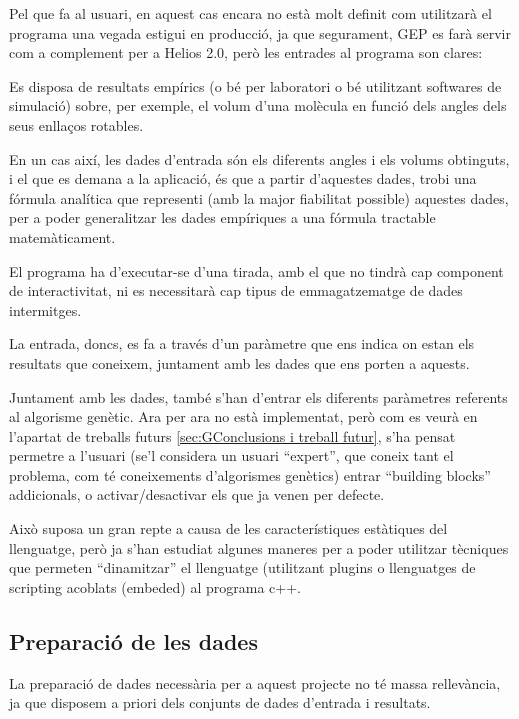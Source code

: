Pel que fa al usuari, en aquest cas encara no està molt definit com utilitzarà
el programa una vegada estigui en producció, ja que segurament, GEP es farà
servir com a complement per a Helios 2.0, però les entrades al programa son
clares:

Es disposa de resultats empírics (o bé per laboratori o bé utilitzant softwares
de simulació) sobre, per exemple, el volum d'una molècula en funció dels angles
dels seus enllaços rotables.

En un cas així, les dades d'entrada són els diferents angles i els volums
obtinguts, i el que es demana a la aplicació, és que a partir d'aquestes dades,
trobi una fórmula analítica que representi (amb la major fiabilitat possible)
aquestes dades, per a poder generalitzar les dades empíriques a una fórmula
tractable matemàticament.

El programa ha d'executar-se d'una tirada, amb el que no tindrà cap component de
interactivitat, ni es necessitarà cap tipus de emmagatzematge de dades
intermitges.

La entrada, doncs, es fa a través d'un paràmetre que ens indica on estan els
resultats que coneixem, juntament amb les dades que ens porten a aquests.

Juntament amb les dades, també s'han d'entrar els diferents paràmetres referents
al algorisme genètic.  Ara per ara no està implementat, però com es veurà en
l'apartat de treballs futurs \ref{sec:GConclusions i treball futur}, s'ha pensat
permetre a l'usuari (se'l considera un usuari ``expert'', que coneix tant el
problema, com té coneixements d'algorismes genètics) entrar ``building blocks''
addicionals, o activar/desactivar els que ja venen per defecte.

Això suposa un gran repte a causa de les característiques estàtiques del
llenguatge, però ja s'han estudiat algunes maneres per a poder utilitzar
tècniques que permeten ``dinamitzar'' el llenguatge (utilitzant plugins o
llenguatges de scripting acoblats (embeded) al programa c++.


\subsection{Preparació de les dades} %
\label{sub:GPreparacio de dades}

La preparació de dades necessària per a aquest projecte no té massa rellevància,
ja que disposem a priori dels conjunts de dades d'entrada i resultats.

